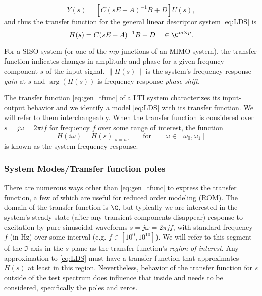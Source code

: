 \begin{equation}
Y(s) = \left[C(sE-A)^{-1}B + D\right]U(s),
\end{equation}
and thus the transfer function for the general linear descriptor system \eqref{eq:LDS} is 
\begin{equation}
H(s) = C(sE-A)^{-1}B + D \quad\in\C^{m\times p}.
\label{eq:gen_tfunc}
\end{equation}

For a SISO system (or one of the $mp$ junctions of an MIMO system), the transfer function  indicates changes in amplitude and phase for a given frequncy component $s$ of the input signal.   $\| H(s) \|$  is the system's frequency response \emph{gain}  at $s$ and $\arg(H(s))$  is frequency response \emph{phase shift}.   

\medskip
The transfer function \eqref{eq:gen_tfunc} of a LTI system characterizes its input-output behavior and we identify a model  
\eqref{eq:LDS} with its transfer function.  We will refer to them interchangeably.    When the transfer function is considered over $s=j\omega=2\pi i f$ for frequency $f$ over some range of interest, the function 
\[
H( i \omega)=\left.H(s)\right|_{s=i \omega} \qquad \text{for} \qquad \omega \in [\omega_0, \omega_1]
\]
  is known as the system frequency response.  

\subsubsection{System Modes/Transfer function poles}\label{sec:tf_modes} 
 There are numerous ways other than \eqref{eq:gen_tfunc} to express the transfer function, a few of which are useful for reduced order modeling (ROM).  
The domain of the transfer function is $\C$, but typically we are interested in the 
system's steady-state (after any transient components disappear) response to excitation by pure sinusoidal waveforms $s=j\omega = 2\pi j f$, with standard frequency $f$ (in Hz) over some interval (e.g. $f\in[10^0, 10^{10} ]$).  We will refer to this segment of the $\Im$-axis in the $s$-plane as the transfer function's \emph{region of interest}. Any approximation to \eqref{eq:LDS} must have a transfer function that approximates  $H(s)$ at least in this region.   Nevertheless,  behavior of the transfer function for $s$ outside of the test spectrum does influence that inside and needs to be considered, specifically the poles and zeros. 

